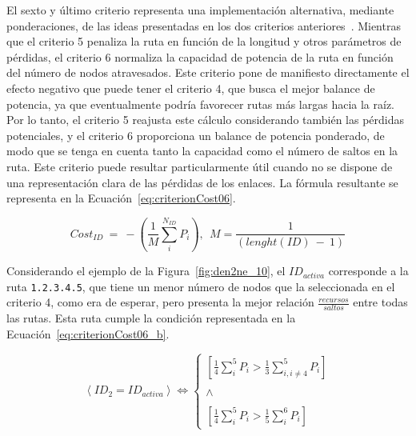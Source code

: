 El sexto y último criterio representa una implementación alternativa, mediante ponderaciones, de las ideas presentadas en los dos criterios anteriores~\cite{Schneider17,Ma97}. Mientras que el criterio 5 penaliza la ruta en función de la longitud y otros parámetros de pérdidas, el criterio 6 normaliza la capacidad de potencia de la ruta en función del número de nodos atravesados. Este criterio pone de manifiesto directamente el efecto negativo que puede tener el criterio 4, que busca el mejor balance de potencia, ya que eventualmente podría favorecer rutas más largas hacia la raíz. Por lo tanto, el criterio 5 reajusta este cálculo considerando también las pérdidas potenciales, y el criterio 6 proporciona un balance de potencia ponderado, de modo que se tenga en cuenta tanto la capacidad como el número de saltos en la ruta. Este criterio puede resultar particularmente útil cuando no se dispone de una representación clara de las pérdidas de los enlaces. La fórmula resultante se representa en la Ecuación~\ref{eq:criterionCost06}.  
 

\begin{equation}\label{eq:criterionCost06}
      Cost_{ID}  \: = \: -(\frac{1}{M}\sum_{i}^{N_{ID}} P_{i}), \: \: M = \frac{1}{(lenght(ID) \: - \: 1)}
\end{equation}
\vspace{0.2cm}

Considerando el ejemplo de la Figura~\ref{fig:den2ne_10}, el $ID_{activa}$ corresponde a la ruta \texttt{1.2.3.4.5}, que tiene un menor número de nodos que la seleccionada en el criterio 4, como era de esperar, pero presenta la mejor relación $\frac{recursos}{saltos}$ entre todas las rutas. Esta ruta cumple la condición representada en la Ecuación~\ref{eq:criterionCost06_b}.

\begin{equation}\label{eq:criterionCost06_b}
           \left \langle ID_{2} = ID_{activa} \right \rangle \Leftrightarrow  
           \left\{\begin{matrix}
           [\frac{1}{4}\sum_{i}^{5} P_{i} > \frac{1}{3}\sum_{i,i\neq4}^{5} P_{i}] \\
       \\
       \wedge \\ 
       \\ [\frac{1}{4}\sum_{i}^{5} P_{i} > \frac{1}{5}\sum_{i}^{6} P_{i}]
           \end{matrix}\right.
\end{equation}
\vspace{0.2cm}


